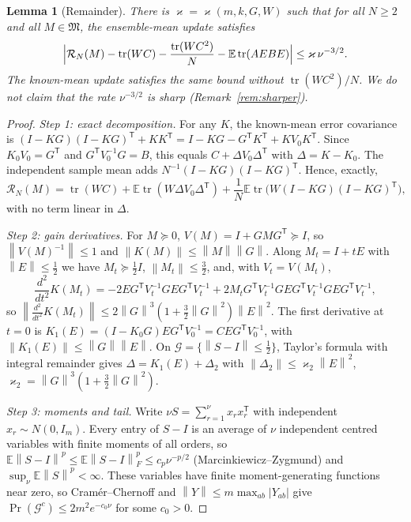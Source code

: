 \documentclass[11pt,a4paper]{article}
\numberwithin{equation}{section}
\newtheorem{lemma}[theorem]{Lemma}
\theoremstyle{remark}\newtheorem{remark}[theorem]{Remark}
\newcommand{\E}{\mathbb E}
\newcommand{\tr}{\operatorname{tr}}
\newcommand{\risk}{\mathcal R}
\newcommand{\T}{^{\mathsf T}}
\newcommand{\norm}[1]{\left\lVert#1\right\rVert}
\begin{document}
\begin{lemma}[Remainder]\label{lem:remainder}
There is \(\varkappa=\varkappa(m,k,G,W)\) such that for all \(N\ge2\) and all \(M\in\mathfrak M\), the
ensemble-mean update satisfies
\begin{equation}\label{eq:remainder}
 \Bigl|\risk_N(M)-\tr(WC)-\frac{\tr(WC^2)}N-\E\tr(AEBE)\Bigr|\le\varkappa\,\nu^{-3/2}.
\end{equation}
The known-mean update satisfies the same bound without \(\tr(WC^2)/N\). We do not claim that the
rate \(\nu^{-3/2}\) is sharp (Remark~\ref{rem:sharper}).
\end{lemma}
\begin{proof}
\emph{Step 1: exact decomposition.} For any \(K\), the known-mean error covariance is
\((I-KG)(I-KG)\T+KK\T=I-KG-G\T K\T+KV_0K\T\). Since \(K_0V_0=G\T\) and \(G\T V_0^{-1}G=B\), this
equals \(C+\Delta V_0\Delta\T\) with \(\Delta=K-K_0\). The independent sample mean adds
\(N^{-1}(I-KG)(I-KG)\T\). Hence, exactly,
\begin{equation}\label{eq:exactdecomp}
 \risk_N(M)=\tr(WC)+\E\tr(W\Delta V_0\Delta\T)+\frac1N\E\tr\bigl(W(I-KG)(I-KG)\T\bigr),
\end{equation}
with no term linear in \(\Delta\).

\emph{Step 2: gain derivatives.} For \(M\succeq0\), \(V(M)=I+GMG\T\succeq I\), so
\(\norm{V(M)^{-1}}\le1\) and \(\norm{K(M)}\le\norm M\norm G\). Along \(M_t=I+tE\) with
\(\norm E\le\frac12\) we have \(M_t\succeq\frac12I\), \(\norm{M_t}\le\frac32\), and, with
\(V_t=V(M_t)\),
\[
 \frac{d^2}{dt^2}K(M_t)=-2EG\T V_t^{-1}GEG\T V_t^{-1}
 +2M_tG\T V_t^{-1}GEG\T V_t^{-1}GEG\T V_t^{-1},
\]
so \(\norm{\tfrac{d^2}{dt^2}K(M_t)}\le2\norm G^3(1+\tfrac32\norm G^2)\norm E^2\). The first
derivative at \(t=0\) is \(K_1(E)=(I-K_0G)EG\T V_0^{-1}=CEG\T V_0^{-1}\), with
\(\norm{K_1(E)}\le\norm G\norm E\). On \(\mathcal G=\{\norm{S-I}\le\frac12\}\), Taylor's formula with
integral remainder gives \(\Delta=K_1(E)+\Delta_2\) with \(\norm{\Delta_2}\le\varkappa_2\norm E^2\),
\(\varkappa_2=\norm G^3(1+\tfrac32\norm G^2)\).

\emph{Step 3: moments and tail.} Write \(\nu S=\sum_{r=1}^\nu x_rx_r\T\) with independent
\(x_r\sim N(0,I_m)\). Every entry of \(S-I\) is an average of \(\nu\) independent centred variables
with finite moments of all orders, so \(\E\norm{S-I}^p\le\E\norm{S-I}_F^p\le c_p\nu^{-p/2}\)
(Marcinkiewicz--Zygmund) and \(\sup_\nu\E\norm S^p<\infty\). These variables have finite
moment-generating functions near zero, so Cram\'er--Chernoff and
\(\norm Y\le m\max_{ab}|Y_{ab}|\) give \(\Pr(\mathcal G^c)\le2m^2e^{-c_0\nu}\) for some
\(c_0>0\).


\end{proof}
\end{document}
